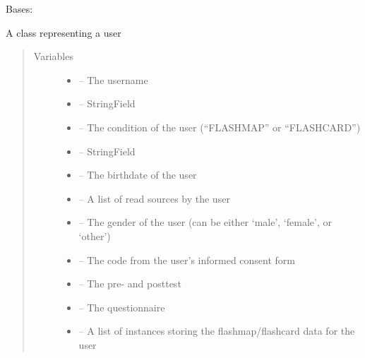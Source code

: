 \documentclass[letterpaper,10pt,english]{sphinxmanual}
\begin{document}
\begin{fulllineitems}
\label{\detokenize{user:user.User}}
Bases: 

A class representing a user
\begin{quote}\begin{description}
\item[{Variables}] \leavevmode\begin{itemize}
\item {} 
 -- The username

\item {} 
\href{https://docs.python.org/2/library/functions.html\#type}{} -- StringField

\item {} 
 -- The condition of the user (``FLASHMAP'' or ``FLASHCARD'')

\item {} 
\href{https://docs.python.org/2/library/functions.html\#type}{} -- StringField

\item {} 
 -- The birthdate of the user

\item {} 
 -- A list of read sources by the user

\item {} 
 -- The gender of the user (can be either `male', `female', or `other')

\item {} 
\href{https://docs.python.org/2/library/code.html\#module-code}{} -- The code from the user's informed consent form

\item {} 
 -- The pre- and posttest

\item {} 
{\hyperref[\detokenize{questionnaire:module-questionnaire}]{}} -- The questionnaire

\item {} 
 -- A list of instances storing the flashmap/flashcard data for the user


\end{itemize}
\end{description}
\end{quote}
\end{fulllineitems}
\end{document}

